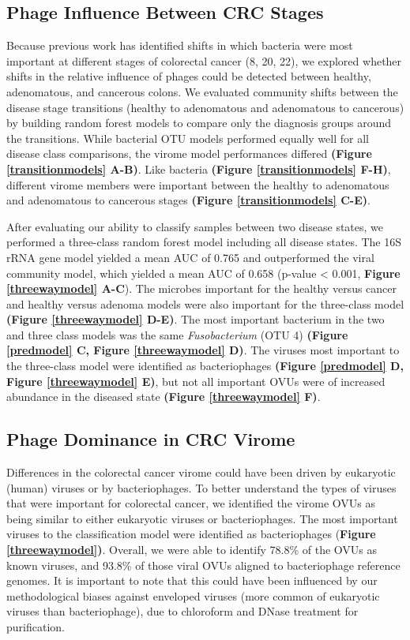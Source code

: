 \documentclass[12pt,]{article}
\begin{document}
\subsection{Phage Influence Between CRC
Stages}\label{phage-influence-between-crc-stages}

Because previous work has identified shifts in which bacteria were most
important at different stages of colorectal cancer (8, 20, 22), we
explored whether shifts in the relative influence of phages could be
detected between healthy, adenomatous, and cancerous colons. We
evaluated community shifts between the disease stage transitions
(healthy to adenomatous and adenomatous to cancerous) by building random
forest models to compare only the diagnosis groups around the
transitions. While bacterial OTU models performed equally well for all
disease class comparisons, the virome model performances differed
\textbf{(Figure \ref{transitionmodels} A-B)}. Like bacteria
\textbf{(Figure \ref{transitionmodels} F-H)}, different virome members
were important between the healthy to adenomatous and adenomatous to
cancerous stages \textbf{(Figure \ref{transitionmodels} C-E)}.

After evaluating our ability to classify samples between two disease
states, we performed a three-class random forest model including all
disease states. The 16S rRNA gene model yielded a mean AUC of 0.765 and
outperformed the viral community model, which yielded a mean AUC of
0.658 (p-value \textless{} 0.001, \textbf{Figure \ref{threewaymodel}
A-C}). The microbes important for the healthy versus cancer and healthy
versus adenoma models were also important for the three-class model
\textbf{(Figure \ref{threewaymodel} D-E)}. The most important bacterium
in the two and three class models was the same \emph{Fusobacterium} (OTU
4) \textbf{(Figure \ref{predmodel} C, Figure \ref{threewaymodel} D)}.
The viruses most important to the three-class model were identified as
bacteriophages \textbf{(Figure \ref{predmodel} D, Figure
\ref{threewaymodel} E)}, but not all important OVUs were of increased
abundance in the diseased state \textbf{(Figure \ref{threewaymodel} F)}.

\subsection{Phage Dominance in CRC
Virome}\label{phage-dominance-in-crc-virome}

Differences in the colorectal cancer virome could have been driven by
eukaryotic (human) viruses or by bacteriophages. To better understand
the types of viruses that were important for colorectal cancer, we
identified the virome OVUs as being similar to either eukaryotic viruses
or bacteriophages. The most important viruses to the classification
model were identified as bacteriophages (\textbf{Figure
\ref{threewaymodel})}. Overall, we were able to identify 78.8\% of the
OVUs as known viruses, and 93.8\% of those viral OVUs aligned to
bacteriophage reference genomes. It is important to note that this could
have been influenced by our methodological biases against enveloped
viruses (more common of eukaryotic viruses than bacteriophage), due to
chloroform and DNase treatment for purification.
\end{document}
